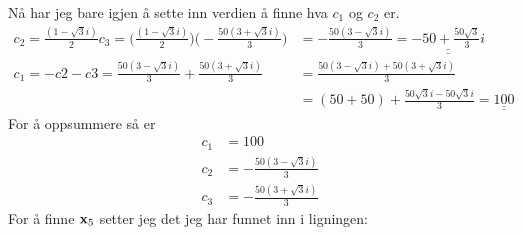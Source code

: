 \documentclass[a4paper,12pt,norsk]{article}
\begin{document}
Nå har jeg bare igjen å sette inn verdien å finne hva $c_1$ og $c_2$ er.
\begin{align*}
c_2 = \frac{(1 - \sqrt{3}i)}{2}c_3 = \Big(\frac{(1 - \sqrt{3}i)}{2}\Big)\Big(- \frac{50(3+\sqrt{3}i)}{3}\Big) 
&= -\frac{50(3-\sqrt{3}i)}{3} = \underline{\underline{-50 + \frac{50\sqrt{3}}{3}i}}\\
c_1 = -c2 -c3 = \frac{50(3-\sqrt{3}i)}{3} + \frac{50(3+\sqrt{3}i)}{3} &= \frac{50(3-\sqrt{3}i)+50(3+\sqrt{3}i)}{3} \\
&= (50 + 50) + \frac{50\sqrt{3}i-50\sqrt{3}i}{3}  = \underline{\underline{100}}
\end{align*}
For å oppsummere så er 
\begin{align*}
c_1 &= 100\\
c_2 &= -\frac{50(3-\sqrt{3}i)}{3}\\
c_3 &= -\frac{50(3+\sqrt{3}i)}{3}
\end{align*}
For å finne $\bold{x}_5$ setter jeg det jeg har funnet inn i ligningen:
\end{document}
